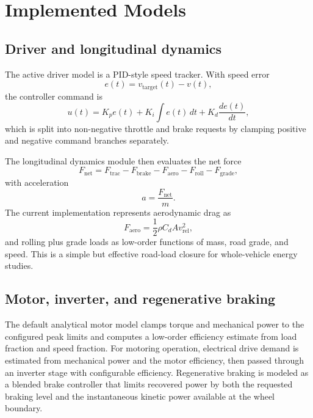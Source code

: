 \documentclass[11pt,a4paper]{article}
\begin{document}
\section{Implemented Models}
\subsection{Driver and longitudinal dynamics}
The active driver model is a PID-style speed tracker. With speed error
\begin{equation}
e(t) = v_{\mathrm{target}}(t) - v(t),
\end{equation}
the controller command is
\begin{equation}
u(t) = K_p e(t) + K_i \int e(t)\,dt + K_d \frac{de(t)}{dt},
\end{equation}
which is split into non-negative throttle and brake requests by clamping positive and negative command branches separately.

The longitudinal dynamics module then evaluates the net force
\begin{equation}
F_{\mathrm{net}} =
F_{\mathrm{trac}} - F_{\mathrm{brake}} - F_{\mathrm{aero}} - F_{\mathrm{roll}} - F_{\mathrm{grade}},
\end{equation}
with acceleration
\begin{equation}
a = \frac{F_{\mathrm{net}}}{m}.
\end{equation}
The current implementation represents aerodynamic drag as
\begin{equation}
F_{\mathrm{aero}} = \frac{1}{2}\rho C_d A v_{\mathrm{rel}}^2,
\end{equation}
and rolling plus grade loads as low-order functions of mass, road grade, and speed. This is a simple but effective road-load closure for whole-vehicle energy studies.

\subsection{Motor, inverter, and regenerative braking}
The default analytical motor model clamps torque and mechanical power to the configured peak limits and computes a low-order efficiency estimate from load fraction and speed fraction. For motoring operation, electrical drive demand is estimated from mechanical power and the motor efficiency, then passed through an inverter stage with configurable efficiency. Regenerative braking is modeled as a blended brake controller that limits recovered power by both the requested braking level and the instantaneous kinetic power available at the wheel boundary.
\end{document}
